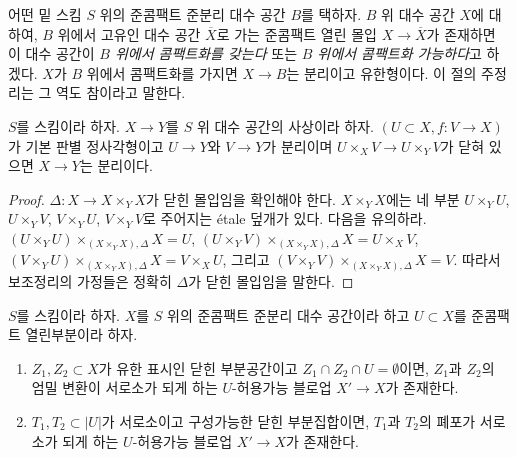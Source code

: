 \medskip\noindent
어떤 밑 스킴 $S$ 위의 준콤팩트 준분리 대수 공간 $B$를 택하자.
$B$ 위 대수 공간 $X$에 대하여, $B$ 위에서 고유인 대수 공간
$\overline{X}$로 가는 준콤팩트 열린 몰입
$X \to \overline{X}$가 존재하면 이 대수 공간이 {\it $B$ 위에서 콤팩트화를
갖는다} 또는 {\it $B$ 위에서 콤팩트화 가능하다}고 하겠다.
$X$가 $B$ 위에서 콤팩트화를 가지면 $X \to B$는 분리이고
유한형이다. 이 절의 주정리는 그 역도 참이라고 말한다.

\begin{lemma}
\label{lemma-check-separated}
$S$를 스킴이라 하자. $X \to Y$를 $S$ 위 대수 공간의 사상이라 하자.
$(U \subset X, f : V \to X)$가 기본 판별 정사각형이고
$U \to Y$와 $V \to Y$가 분리이며
$U \times_X V \to U \times_Y V$가 닫혀 있으면 $X \to Y$는 분리이다.
\end{lemma}

\begin{proof}
$\Delta : X \to X \times_Y X$가 닫힌 몰입임을 확인해야 한다.
$X \times_Y X$에는 네 부분
$U \times_Y U$, $U \times_Y V$, $V \times_Y U$, $V \times_Y V$로
주어지는 \'etale 덮개가 있다. 다음을 유의하라.
$(U \times_Y U) \times_{(X \times_Y X), \Delta} X  = U$,
$(U \times_Y V) \times_{(X \times_Y X), \Delta} X = U \times_X V$,
$(V \times_Y U) \times_{(X \times_Y X), \Delta} X = V \times_X U$, 그리고
$(V \times_Y V) \times_{(X \times_Y X), \Delta} X = V$.
따라서 보조정리의 가정들은 정확히 $\Delta$가 닫힌 몰입임을 말한다.
\end{proof}

\begin{lemma}
\label{lemma-separate-disjoint-locally-closed-by-blowing-up}
$S$를 스킴이라 하자.
$X$를 $S$ 위의 준콤팩트 준분리 대수 공간이라 하고
$U \subset X$를 준콤팩트 열린부분이라 하자.
\begin{enumerate}
\item $Z_1, Z_2 \subset X$가 유한 표시인 닫힌 부분공간이고
$Z_1 \cap Z_2 \cap U = \emptyset$이면, $Z_1$과 $Z_2$의 엄밀 변환이
서로소가 되게 하는 $U$-허용가능 블로업 $X' \to X$가 존재한다.
\item $T_1, T_2 \subset |U|$가 서로소이고 구성가능한 닫힌
부분집합이면, $T_1$과 $T_2$의 폐포가 서로소가 되게 하는
$U$-허용가능 블로업 $X' \to X$가 존재한다.
\end{enumerate}
\end{lemma}

